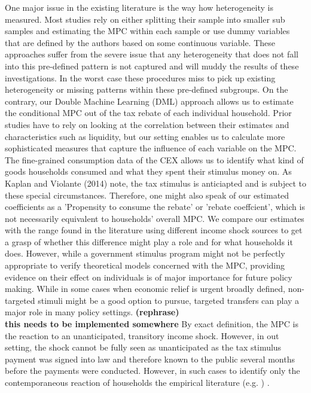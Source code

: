 One major issue in the existing literature is the way how heterogeneity is measured. Most studies rely on either splitting their sample into smaller sub samples and estimating the MPC within each sample or use dummy variables that are defined by the authors based on some continuous variable. These approaches suffer from the severe issue that any heterogeneity that does not fall into this pre-defined pattern is not captured and will muddy the results of these investigations. In the worst case these procedures miss to pick up existing heterogeneity or missing patterns within these pre-defined subgroups. On the contrary, our Double Machine Learning (DML) approach allows us to estimate the conditional MPC out of the tax rebate of each individual household. Prior studies have to rely on looking at the correlation between their estimates and characteristics such as liquidity, but our setting enables us to calculate more sophisticated measures that capture the influence of each variable on the MPC. \\
The fine-grained consumption data of the CEX allows us to identify what kind of goods households consumed and what they spent their stimulus money on. As Kaplan and Violante (2014) note, the tax stimulus is anticiapted and is subject to these special circumstances. Therefore, one might also speak of our estimated coefficients as a 'Propensity to consume the rebate' or 'rebate coeffcient', which is not necessarily equivalent to households' overall MPC. We compare our estimates with the range found in the literature using different income shock sources to get a grasp of whether this difference might play a role and for what households it does. However, while a government stimulus program might not be perfectly appropriate to verify theoretical models concerned with the MPC, providing evidence on their effect on individuals is of major importance for future policy making. While in some cases when economic relief is urgent broadly defined, non-targeted stimuli might be a good option to pursue, targeted transfers can play a major role in many policy settings. \textbf{(rephrase)}\\ 

\textbf{this needs to be implemented somewhere}
By exact definition, the MPC is the reaction to an unanticipated, transitory income shock. However, in out setting, the shock cannot be fully seen as unanticipated as the tax stimulus payment was signed into law and therefore known to the public several months before the payments were conducted. However, in such cases to identify only the contemporaneous reaction of households the empirical literature (e.g. \cite{parker_etal_13}) .  \\ 

